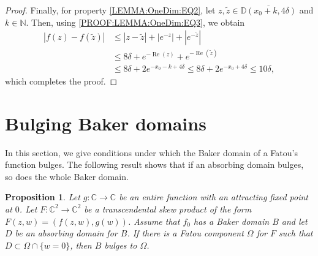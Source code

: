 \documentclass[a4paper, 12pt, twoside]{amsart}
\newtheorem{prop}[thm]{Proposition}
\theoremstyle{definition}
\numberwithin{equation}{section}
\renewcommand{\Re}{\operatorname{Re}}
\newcommand{\C}{{\mathbb C}}
\newcommand{\D}{{\mathbb D}}
\newcommand{\N}{{\mathbb N}}
\begin{document}
\begin{proof}
    Finally, for property \eqref{LEMMA:OneDim:EQ2}, let $z,\tilde{z}\in \overline{\D(x_0 + k, 4\delta)}$ and $k\in\N$. Then, using \eqref{PROOF:LEMMA:OneDim:EQ3}, we obtain
    \begin{equation*}
        \begin{split}
            |{f(z) - f(\tilde{z})}| &\leq |{z - \tilde{z}}| + |{e^{-z}}| + |{e^{-\tilde{z}}}| \\
            &\leq 8\delta + e^{-\Re(z)} + e^{-\Re(\tilde{z})} \\
            &\leq 8\delta + 2 e^{-x_0 - k + 4 \delta} %
            \leq 8\delta + 2 e^{-x_0 + 4 \delta} %
            \leq 10\delta,
        \end{split}
    \end{equation*}
    which completes the proof.
\end{proof}
  
\section{Bulging Baker domains}\label{bulging}

In this section, we give conditions under which the Baker domain of a Fatou's function bulges. The following result shows that if an absorbing  domain bulges, so does the whole Baker domain.

\begin{prop}\label{lem:absorbing implies everything} 
Let $g\colon\C\to\C$ be an entire function with an attracting fixed point  at $0$. Let $F \colon \mathbb{C}^2 \to \mathbb{C}^2$ be a transcendental skew product of the form $F(z,w)=(f(z,w),g(w))$. Assume that $f_0$ has a Baker domain $B$ and let  $D$ be  an absorbing domain for $B$. If there is a Fatou component $\Omega$ for $F$ such that $D\subset\Omega\cap \{w=0\}$, then $B$ bulges to $\Omega$.
\end{prop} 
\end{document}
